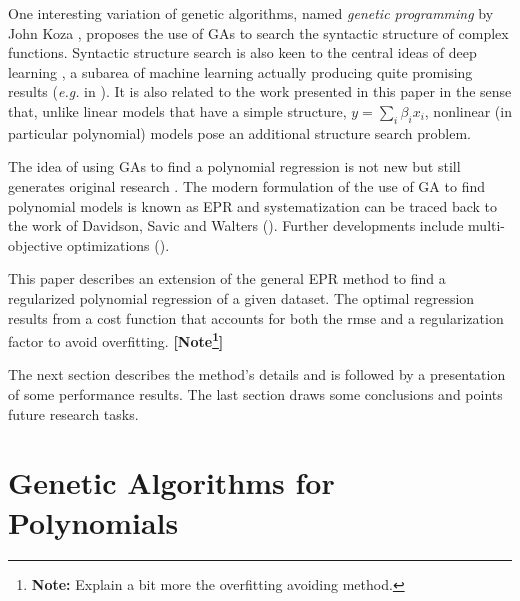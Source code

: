 \documentclass[preprint,authoryear,12pt]{elsarticle}
\newcommand{\note}[1]{\textbf{\small [Note\footnote{\textbf{Note:} #1}]}}
\begin{document}
One interesting variation of genetic algorithms, named \emph{genetic programming} by John Koza \citep{Koza:1992aa}, proposes the use of \acp{GA} to search the syntactic structure of complex functions. Syntactic structure search is also keen to the central ideas of deep learning \citep{Bengio:2009aa,Bengio:2013aa}, a subarea of machine learning actually producing quite promising results (\emph{e.g.} in \cite{Tarlow:2013fk}). It is also related to the work presented in this paper in the sense that, unlike linear models that have a simple structure, $y=\sum_i \beta_i x_i$, nonlinear (in particular polynomial) models pose an additional structure search problem.

The idea of using \acp{GA} to find a polynomial regression is not new \citep{Maertens:2006aa, Yu:2008aa, Wu:2009aa} but still generates original research \citep{Hofwing:2011aa,Cetisli:2011aa}. The modern formulation of the use of \ac{GA} to find polynomial models is known as \acf{EPR} and systematization can be traced back to the work of Davidson, Savic and Walters (\cite{Davidson:2003aa}). Further developments include multi-objective optimizations (\cite{Giustolisi:2009aa}). 

This paper describes an extension of the general \ac{EPR} method to find a regularized polynomial regression of a given dataset. The optimal regression results from a cost function that accounts for both the \ac{rmse} and a regularization factor to avoid overfitting. \note{Explain a bit more the overfitting avoiding method.}



The next section describes the method's details and is followed by a presentation of some performance results. The last section draws some conclusions and points future research tasks.

\section{Genetic Algorithms for Polynomials}
\end{document}
